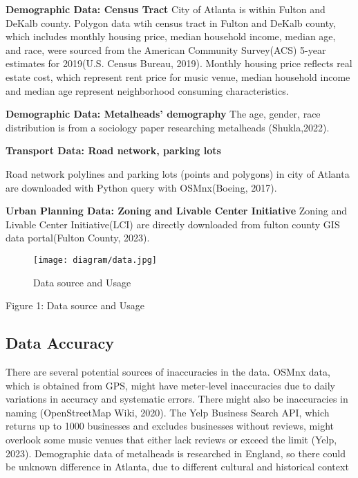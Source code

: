 \documentclass[11pt]{article}
\begin{document}
\textbf{Demographic Data: Census Tract}
City of Atlanta is within Fulton and DeKalb county. Polygon data wtih census tract in Fulton and DeKalb county, which includes monthly housing price, median household income, median age, and race, were sourced from the American Community Survey(ACS) 5-year estimates for 2019(U.S. Census Bureau, 2019). Monthly housing price reflects real estate cost, which represent rent price for music venue, median household income and median age represent neighborhood consuming characteristics.

\textbf{Demographic Data: Metalheads' demography}
The age, gender, race distribution is from a sociology paper researching metalheads (Shukla,2022).

\textbf{Transport Data: Road network, parking lots} 

Road network polylines and parking lots (points and polygons) in city of Atlanta are downloaded with Python query with OSMnx(Boeing, 2017).

\textbf{Urban Planning Data: Zoning and Livable Center Initiative}
Zoning and Livable Center Initiative(LCI) are directly downloaded from fulton county GIS data portal(Fulton County, 2023).



\begin{figure}[H]
\begin{center}
\centering
\texttt{[image: diagram/data.jpg]}
\caption{Data source and Usage}
\label{fig:figure1}
\end{center}
\end{figure}

\begin{center}
\centering
Figure 1: Data source and Usage
\end{center}


\subsection{Data Accuracy}

There are several potential sources of inaccuracies in the data. OSMnx data, which is obtained from GPS, might have meter-level inaccuracies due to daily variations in accuracy and systematic errors. There might also be inaccuracies in naming (OpenStreetMap Wiki, 2020). The Yelp Business Search API, which returns up to 1000 businesses and excludes businesses without reviews, might overlook some music venues that either lack reviews or exceed the limit (Yelp, 2023). Demographic data of metalheads is researched in England, so there could be unknown difference in Atlanta, due to different cultural and historical context
\end{document}
